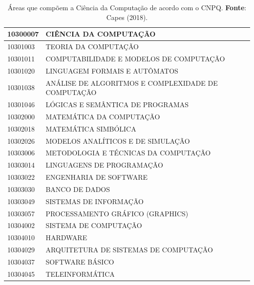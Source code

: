 \begin{table}[t]
	\caption{Áreas que compõem a Ciência da Computação de acordo com o CNPQ. \textbf{Fonte}: Capes (2018).}
	\label{tab:AreasCNPQ}
	\begin{tabular}{|l|l|}
		\hline
		\textbf{10300007} & \textbf{CIÊNCIA DA COMPUTAÇÃO}                     \\ \hline
		10301003          & TEORIA DA COMPUTAÇÃO                               \\ \hline
		10301011          & COMPUTABILIDADE E MODELOS DE COMPUTAÇÃO            \\ \hline
		10301020          & LINGUAGEM FORMAIS E AUTÔMATOS                      \\ \hline
		10301038          & ANÁLISE DE ALGORITMOS E COMPLEXIDADE DE COMPUTAÇÃO \\ \hline
		10301046          & LÓGICAS E SEMÂNTICA DE PROGRAMAS                   \\ \hline
		10302000          & MATEMÁTICA DA COMPUTAÇÃO                           \\ \hline
		10302018          & MATEMÁTICA SIMBÓLICA                               \\ \hline
		10302026          & MODELOS ANALÍTICOS E DE SIMULAÇÃO                  \\ \hline
		10303006          & METODOLOGIA E TÉCNICAS DA COMPUTAÇÃO               \\ \hline
		10303014          & LINGUAGENS DE PROGRAMAÇÃO                          \\ \hline
		10303022          & ENGENHARIA DE SOFTWARE                             \\ \hline
		10303030          & BANCO DE DADOS                                     \\ \hline
		10303049          & SISTEMAS DE INFORMAÇÃO                             \\ \hline
		10303057          & PROCESSAMENTO GRÁFICO (GRAPHICS)                   \\ \hline
		10304002          & SISTEMA DE COMPUTAÇÃO                              \\ \hline
		10304010          & HARDWARE                                           \\ \hline
		10304029          & ARQUITETURA DE SISTEMAS DE COMPUTAÇÃO              \\ \hline
		10304037          & SOFTWARE BÁSICO                                    \\ \hline
		10304045          & TELEINFORMÁTICA                                    \\ \hline
	\end{tabular}
\end{table}


